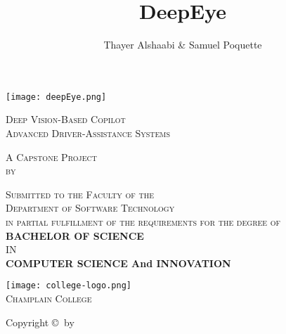 \title{DeepEye}
\author{Thayer Alshaabi \& Samuel Poquette}

\makeatletter
\let\thetitle\@title
\let\theauthors\@author
\makeatother

{
    \centering
    \vspace*{\fill}
    \texttt{[image: deepEye.png]} \\
    \vspace{0.5 in}
    {\Huge\textsc{\thetitle}\unskip\strut\par}
    \vspace{0.5 in}
    {\Large\textsc{Deep Vision-Based Copilot \\ Advanced Driver-Assistance Systems}\unskip\strut\par}
	\vspace{1 in}
    \textsc{
      A Capstone Project \\
      by \\
    }
    \vspace{0.5 in}
    \textsc{\theauthors} \unskip\strut\par
    \vspace*{\fill}
    
    \newpage
    \vspace*{\fill}
  	\textsc{
    	Submitted to the Faculty of the \\
		Department of Software Technology \\
		in partial fulfillment of the requirements for the degree of \\
	}
    \vspace{0.5 in}
    {\bfseries BACHELOR OF SCIENCE \\}
    IN \\
    {\bfseries COMPUTER SCIENCE And INNOVATION}

    \vspace{1 in}
   	\texttt{[image: college-logo.png]} \\
    \textsc{\large Champlain College \\}
    \the\year
    \vspace*{\fill}
    
    \newpage
    \vspace*{\fill}
    \begin{center}
        Copyright \copyright $~$ by \theauthors \par\bigskip \the\year  
    \end{center}
    \vspace*{\fill}     
}
